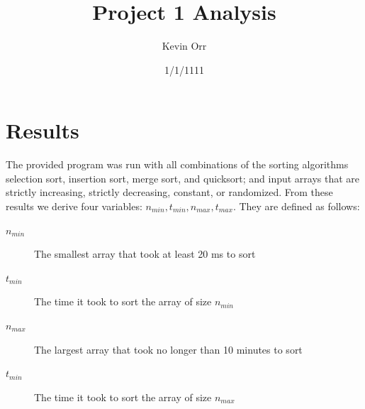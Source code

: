 \documentclass[11pt]{article}
\author{Kevin Orr}
\date{1/1/1111}
\title{Project 1 Analysis}
\begin{document}
\maketitle

\section{Results}
\label{sec:org018e136}

The provided program was run with all combinations of the sorting algorithms selection sort,
insertion sort, merge sort, and quicksort; and input arrays that are strictly increasing, strictly
decreasing, constant, or randomized. From these results we derive four variables:
\(n_{min}, t_{min}, n_{max}, t_{max}\). They are defined as follows:

\begin{description}
\item[$n_{min}$] The smallest array that took at least 20 ms to sort
\item[$t_{min}$] The time it took to sort the array of size $n_{min}$
\item[$n_{max}$] The largest array that took no longer than 10 minutes to sort
\item[$t_{min}$] The time it took to sort the array of size $n_{max}$
\end{description}
\end{document}
